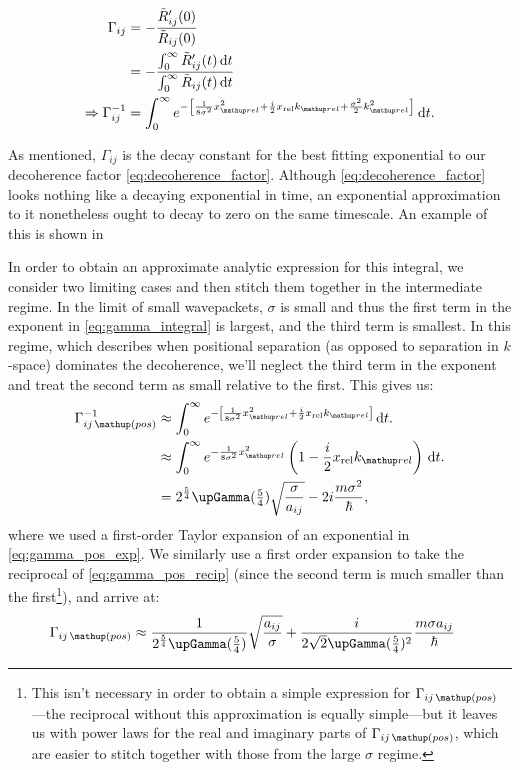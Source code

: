 \begin{align}
\Gamma_{ij} &= -\frac {\tilde R_{ij}^\prime(0)} {\tilde R_{ij}(0)}\\
&= -\frac {\int_0^\infty \tilde R_{ij}^\prime(t)\,\dd t} {\int_0^\infty \tilde R_{ij}(t)\, \dd t}\\
\Rightarrow \Gamma_{ij}^{-1}&= \int_0^\infty e^{-\left[
        \frac{1} {8\sigma^2} x_\up{rel}^2
      + \frac i2 x_{\mathrm{rel}} k_\up{rel}
      + \frac{\sigma^2}{2} k_\up{rel}^2
      \right]}\, \dd t.\label{eq:gamma_integral}
\end{align}

As mentioned, $\Gamma_{ij}$ is the decay constant for the best fitting exponential to our decoherence factor \eqref{eq:decoherence_factor}. Although \eqref{eq:decoherence_factor} looks nothing like a decaying exponential in time, an exponential approximation to it nonetheless ought to decay to zero on the same timescale. An example of this is shown in 

In order to obtain an approximate analytic expression for this integral, we consider two limiting cases and then stitch them together in the intermediate regime. In the limit of small wavepackets, $\sigma$ is small and thus the first term in the exponent in \eqref{eq:gamma_integral} is largest, and the third term is smallest. In this regime, which describes when positional separation (as opposed to separation in $k$-space) dominates the decoherence, we'll neglect the third term in the exponent and treat the second term as small relative to the first.
This gives us:
\begin{align}
\Gamma_{ij\,\up{(pos)}}^{-1} &\approx \int_0^\infty e^{-\left[
        \frac{1} {8\sigma^2} x_\up{rel}^2
      + \frac i2 x_{\mathrm{rel}} k_\up{rel}
      \right]}\, \dd t.\\
      &\approx \int_0^\infty e^{-
              \frac{1} {8\sigma^2} x_\up{rel}^2}\left(1 - \frac i2 x_{\mathrm{rel}} k_\up{rel}\right)\, \dd t.\label{eq:gamma_pos_exp}\\
      &= 2^{\frac54}\upGamma(\tfrac54)\sqrt{\frac{\sigma}{a_{ij}}} - 2i\frac{m \sigma^2}{\hbar},\label{eq:gamma_pos_recip}
\end{align}
where we used a first-order Taylor expansion of an exponential in \eqref{eq:gamma_pos_exp}. We similarly use a first order expansion to take the reciprocal of \eqref{eq:gamma_pos_recip} (since the second term is much smaller than the first\footnote{This isn't necessary in order to obtain a simple expression for $\Gamma_{ij\,\up{(pos)}}$---the reciprocal without this approximation is equally simple---but it leaves us with power laws for the real and imaginary parts of $\Gamma_{ij\,\up{(pos)}}$, which are easier to stitch together with those from the large $\sigma$ regime.}), and arrive at:
\begin{align}
\Gamma_{ij\,\up{(pos)}} &\approx \frac1{2^{\frac54}\upGamma(\tfrac54)}\sqrt{\frac{a_{ij}}{\sigma}}
+ \frac i {2\sqrt{2}\upGamma(\tfrac54)^2} \frac{m\sigma a_{ij}}{\hbar}\label{eq:gamma_pos_final}%
\end{align}

